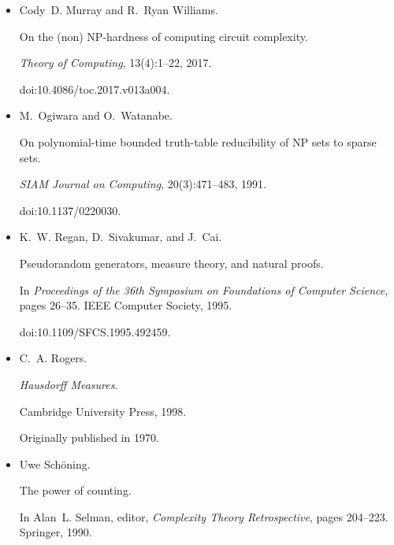 \documentclass[10pt,a4paper]{article}
\begin{document}
\begin{itemize}
doi:10.1007/3-540-48686-0\_21.





\item[] 
[65]

Cody D. Murray and R. Ryan Williams.


On the (non) NP-hardness of computing circuit complexity.


\emph{Theory of Computing}, 13(4):1–22, 2017.


doi:10.4086/toc.2017.v013a004.





\item[] 
[66]

M. Ogiwara and O. Watanabe.


On polynomial-time bounded truth-table reducibility of NP sets to
sparse sets.


\emph{SIAM Journal on Computing}, 20(3):471–483, 1991.


doi:10.1137/0220030.





\item[] 
[67]

K. W. Regan, D. Sivakumar, and J. Cai.


Pseudorandom generators, measure theory, and natural proofs.


In \emph{Proceedings of the 36th Symposium on Foundations of Computer
Science}, pages 26–35. IEEE Computer Society, 1995.


doi:10.1109/SFCS.1995.492459.





\item[] 
[68]

C. A. Rogers.


\emph{Hausdorff Measures}.


Cambridge University Press, 1998.


Originally published in 1970.





\item[] 
[69]

Uwe Schöning.


The power of counting.


In Alan L. Selman, editor, \emph{Complexity Theory Retrospective},
pages 204–223. Springer, 1990.



\end{itemize}
\end{document}
